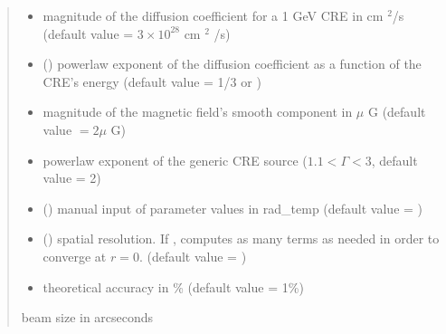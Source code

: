 \documentclass[letterpaper,10pt,english]{sphinxmanual}
\begin{document}
\begin{fulllineitems}
\begin{quote}
\begin{description}
\begin{itemize}
\item {} 
\sphinxAtStartPar
{} \textendash{} magnitude of the diffusion coefficient for a 1 GeV CRE in cm \({}^2\)/s (default value = \(3\times 10^{28}\) cm \({}^2\) /s)

\item {} 
\sphinxAtStartPar
{} (\sphinxstyleliteralemphasis{\sphinxupquote{, }}) \textendash{} power\sphinxhyphen{}law exponent of the diffusion coefficient as a function of the CRE’s energy (default value = 1/3 or )

\item {} 
\sphinxAtStartPar
{} \textendash{} magnitude of the magnetic field’s smooth component in \(\mu\) G (default value \(= 2 \mu\) G)

\item {} 
\sphinxAtStartPar
{} \textendash{} power\sphinxhyphen{}law exponent of the generic CRE source (\(1.1 < \Gamma < 3\), default value = 2)

\item {} 
\sphinxAtStartPar
{} () \textendash{} manual input of parameter values in rad\_temp (default value = )

\item {} 
\sphinxAtStartPar
{} () \textendash{} spatial resolution. If ,  computes as many terms as needed in order to converge at \(r=0\). (default value = )

\item {} 
\sphinxAtStartPar
{} \textendash{} theoretical accuracy in \% (default value = 1\%)

\end{itemize}

\sphinxAtStartPar
beam size in arcseconds


\end{description}
\end{quote}
\end{fulllineitems}
\end{document}
